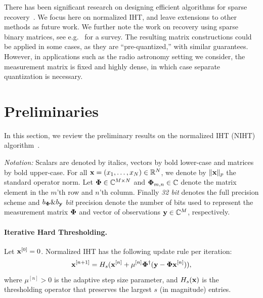 \documentclass{article}
\begin{document}
There has been significant research on 
designing efficient algorithms for sparse recovery~\cite{blumensath2011aiht, wei2015fiht, blanchard2013iht, cevher2011ht, liu2017dualiht}. 
We focus here on normalized IHT, and leave extensions to other methods as future work.
We further note the work on recovery using sparse binary matrices, see e.g.~\cite{gilbert2010sparse} for a survey. 
The resulting matrix constructions could be applied in some cases, as they are ``pre-quantized,'' with similar guarantees. However, in  applications such as the radio astronomy setting we consider, the measurement matrix is fixed and highly dense, in which case separate quantization is necessary. 


\section{Preliminaries}\label{section_iht}

In this section, we review the preliminary results on the normalized IHT (NIHT) algorithm~\cite{blumensath2010niht, blumensath2012greedy}.

{\it Notation:} Scalars are denoted by italics, vectors by bold lower-case and matrices by bold upper-case. For all ${\bf x}= (x_1, \ldots, x_N) \in \mathbb{R}^N$, we denote by $\|{\bf x}\|_p$ the standard operator norm. Let ${\bf \Phi} \in \mathbb{C}^{M\times N}$ and ${\bf \Phi}_{m, n}\in \mathbb{C}$ denote the matrix element in the $m$'th row and $n$'th column. Finally {\it 32 bit} denotes the full precision scheme and $b_{\bf \Phi}\&b_{\bf y}$ {\it bit} precision denote the number of bits used to represent the measurement matrix ${\bf \Phi}$ and vector of observations ${\bf y} \in \mathbb{C}^{M}$, respectively.
\paragraph{Iterative Hard Thresholding.} 
Let ${\bf x}^{[0]} = 0$. Normalized IHT has the following update rule per iteration: 
\begin{equation}\label{iht_update_rule}
{\bf x}^{[n+1]} = H_s({\bf x}^{[n]} + \mu^{[n]}{\bf \Phi}^{\dagger}({\bf y}-{\bf \Phi}{\bf x}^{[n]})),
\end{equation}
where $\mu^{[n]}>0$ is the adaptive step size parameter, and $H_s({\bf x})$ is the
thresholding operator that preserves the largest $s$ (in magnitude) entries.
\end{document}
